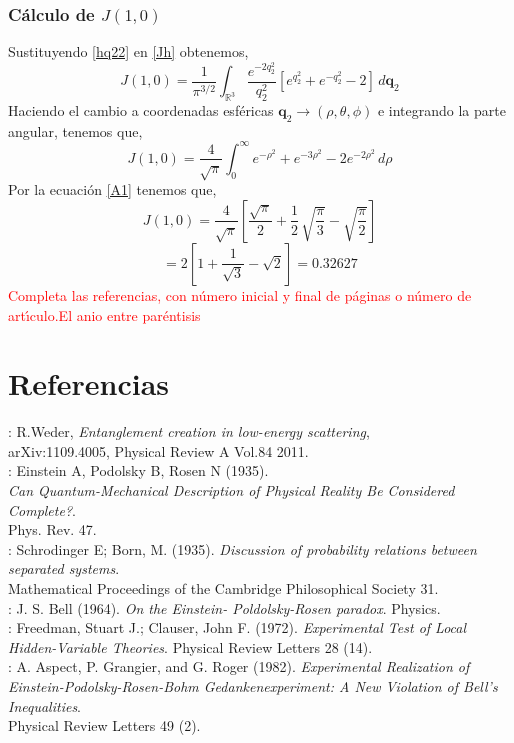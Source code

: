 \documentclass[12pt]{book}
\numberwithin{equation}{chapter}
\def\q{\mathbf{q}}
\def\n{\noindent}
\def\R{\mathbb{R}}
\def\t{\theta}
\def\r{\rho}
\def\p{\phi}
\begin{document}
\section{C\'alculo de $J(1,0)$}
Sustituyendo \eqref{hq22} en \eqref{Jh} obtenemos,
$$ J(1,0)= \frac{1}{\pi^{3/2}} \int_{\R^{3}} \frac{ e^{-2q_{2}^{2}} }{q_{2}^{2}} \left[ e^{q_{2}^{2}} + e^{-q_{2}^{2}} -2 \right]\, d\q_{2}    $$
Haciendo el cambio a coordenadas esf\'ericas $\q_{2} \rightarrow (\r,\t,\p)$ e integrando la parte angular, tenemos que,
$$ J(1,0)= \frac{4}{\sqrt{\pi}} \int_{0}^{\infty} e^{-\r^{2}} + e^{-3\r^{2}} - 2e^{-2\r^{2}} \, d\r $$
Por la ecuaci\'on \eqref{A1} tenemos que,
$$J(1,0)= \frac{4}{\sqrt{\pi}} \left[ \frac{\sqrt{\pi}}{2} +\frac{1}{2}\, \sqrt{\frac{\pi}{3}} -\sqrt{\frac{\pi}{2}} \right] $$
\begin{equation}\label{J10va}
=2 \left[ 1+\frac{1}{\sqrt{3}} -\sqrt{2} \right]= 0.32627
\end{equation}
\textcolor{red}{Completa las referencias, con n\'umero inicial y final de p\'aginas o n\'umero de art\'{\i}culo.El anio entre par\'entisis}
\part{Referencias}

\n [1]: R.Weder, \emph{Entanglement creation in low-energy scattering}, \\
arXiv:1109.4005, Physical Review A Vol.84 2011.\\

\n [2]: Einstein A, Podolsky B, Rosen N (1935). \\
\emph{Can Quantum-Mechanical Description of Physical Reality Be Considered Complete?}. \\
Phys. Rev. 47.\\

\n [3]: Schrodinger E; Born, M. (1935). \emph{Discussion of probability relations between separated systems}.\\
Mathematical Proceedings of the Cambridge Philosophical Society 31.\\

\n [4]: J. S. Bell (1964). \emph{On the Einstein- Poldolsky-Rosen paradox}. Physics.\\

\n [5]: Freedman, Stuart J.; Clauser, John F. (1972). \emph{Experimental Test of Local Hidden-Variable Theories}. Physical Review Letters 28 (14).\\

\n [6]: A. Aspect, P. Grangier, and G. Roger (1982). \emph{Experimental Realization of Einstein-Podolsky-Rosen-Bohm Gedankenexperiment: A New Violation of Bell's Inequalities}. \\
Physical Review Letters 49 (2).\\
\end{document}
